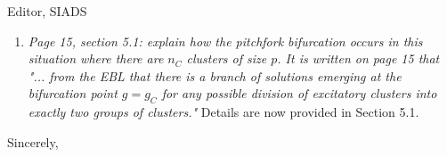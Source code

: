 \documentclass[11pt]{letter}
\begin{document}
\begin{letter}{Editor, SIADS}
\begin{enumerate}
\item \emph{Page 15, section 5.1: explain how the pitchfork bifurcation occurs in this situation where there are $n_C$ clusters of size $p$. It is written on page 15 that "... from the EBL that there is a branch of solutions emerging at the bifurcation point $g = g_C$ for any possible division of excitatory clusters into exactly two groups of clusters." } Details are now provided in Section 5.1.
\vspace{4mm} 

\end{enumerate}


\closing{Sincerely,}

\end{letter}
\end{document}
